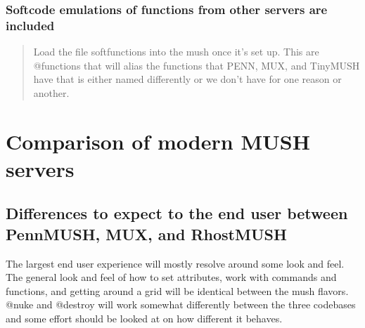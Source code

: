 \documentclass[letterpaper,10pt,english]{sphinxmanual}
\begin{document}
\subsection{Softcode emulations of functions from other servers are included}
\label{\detokenize{features:softcode-emulations-of-functions-from-other-servers-are-included}}\begin{quote}

\sphinxAtStartPar
Load the file softfunctions into the mush once it’s set up.  This are
@functions that will alias the functions that PENN, MUX, and TinyMUSH have
that is either named differently or we don’t have for one reason or another.
\end{quote}


\chapter{Comparison of modern MUSH servers}
\label{\detokenize{differences:comparison-of-modern-mush-servers}}\label{\detokenize{differences::doc}}

\section{Differences to expect to the end user between PennMUSH, MUX, and RhostMUSH}
\label{\detokenize{differences:differences-to-expect-to-the-end-user-between-pennmush-mux-and-rhostmush}}
\sphinxAtStartPar
The largest end user experience will mostly resolve around some look and feel.
The general look and feel of how to set attributes, work with commands and
functions, and getting around a grid will be identical between the mush flavors.
@nuke and @destroy will work somewhat differently between the three codebases
and some effort should be looked at on how different it behaves.
\end{document}

